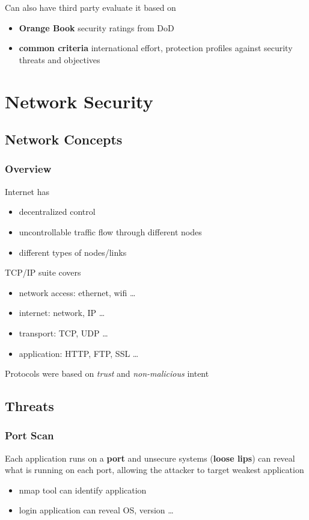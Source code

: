 \documentclass[]{article}
\theoremstyle{definition}
\begin{document}
	Can also have third party evaluate it based on
	\begin{itemize}
		\item \textbf{Orange Book} security ratings from DoD
		\item \textbf{common criteria} international effort, protection profiles against security threats and objectives
	\end{itemize}


	\section{Network Security}
	\subsection{Network Concepts}
	\subsubsection{Overview}
	Internet has
	\begin{itemize}
		\item decentralized control
		\item uncontrollable traffic flow through different nodes
		\item different types of nodes/links
	\end{itemize}
	TCP/IP suite covers
	\begin{itemize}
		\item network access: ethernet, wifi \dots
		\item internet: network, IP \dots
		\item transport: TCP, UDP \dots
		\item application: HTTP, FTP, SSL \dots
	\end{itemize}
	Protocols were based on \textit{trust} and \textit{non-malicious} intent
	\subsection{Threats}
	\subsubsection{Port Scan}
	Each application runs on a \textbf{port} and unsecure systems (\textbf{loose lips}) can reveal what is running on each port, allowing the attacker to target weakest application
	\begin{itemize}
		\item nmap tool can identify application
		\item login application can reveal OS, version \dots
	\end{itemize}
\end{document}
